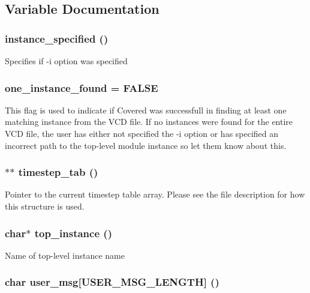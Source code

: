 \subsection{Variable Documentation}
\subsubsection{ {\bf instance\_\-specified} ()}\label{vcd_8c_a2}


Specifies if -i option was specified 
\subsubsection{ {\bf one\_\-instance\_\-found} = FALSE}\label{vcd_8c_a6}


This flag is used to indicate if Covered was successfull in finding at least one matching instance from the VCD file. If no instances were found for the entire VCD file, the user has either not specified the -i option or has specified an incorrect path to the top-level module instance so let them know about this. 
\subsubsection{$\ast$$\ast$ {\bf timestep\_\-tab} ()}\label{vcd_8c_a5}


Pointer to the current timestep table array. Please see the file description for how this structure is used. 
\subsubsection{\setlength{\rightskip}{0pt plus 5cm}char$\ast$ {\bf top\_\-instance} ()}\label{vcd_8c_a1}


Name of top-level instance name 
\subsubsection{\setlength{\rightskip}{0pt plus 5cm}char {\bf user\_\-msg}[USER\_\-MSG\_\-LENGTH] ()}\label{vcd_8c_a0}


